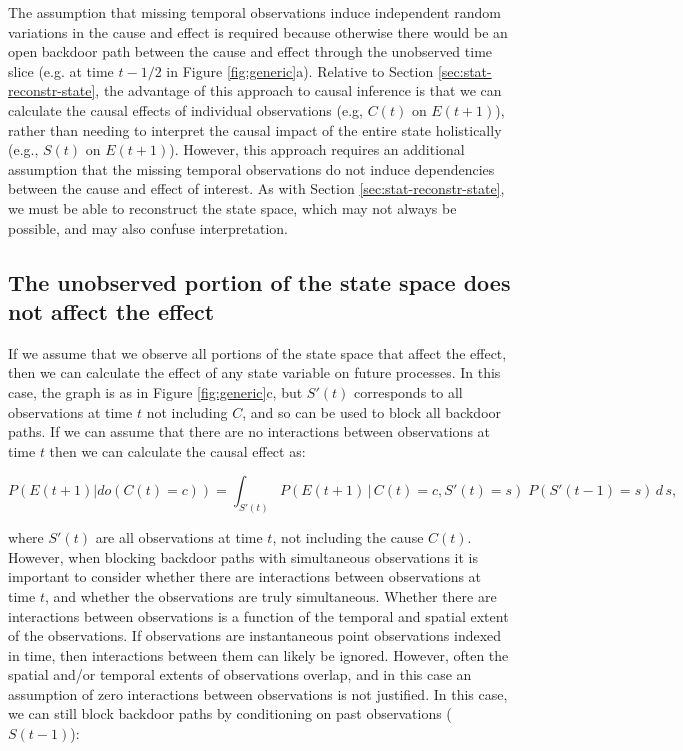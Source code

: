 \documentclass[12pt]{article}
\begin{document}
The assumption that missing temporal observations induce independent
random variations in the cause and effect is required because
otherwise there would be an open backdoor path between the cause and
effect through the unobserved time slice (e.g. at time $t-1/2$ in
Figure \ref{fig:generic}a). Relative to Section
\ref{sec:stat-reconstr-state}, the advantage of this approach to
causal inference is that we can calculate the causal effects of
individual observations (e.g, $C(t)$ on $E(t+1)$), rather than needing
to interpret the causal impact of the entire state holistically (e.g.,
$S(t)$ on $E(t+1)$). However, this approach requires an additional
assumption that the missing temporal observations do not induce
dependencies between the cause and effect of interest. As with Section
\ref{sec:stat-reconstr-state}, we must be able to reconstruct the
state space, which may not always be possible, and may also confuse
interpretation.


\subsection{The unobserved portion of the state space does not affect
  the effect}
\label{sec:observ-port-state}

If we assume that we observe all portions of the state space that
affect the effect, then we can calculate the effect of any state
variable on future processes. In this case, the graph is as in Figure
\ref{fig:generic}c, but $S'(t)$ corresponds to all observations at
time $t$ not including $C$, and so can be used to block all backdoor
paths. If we can assume that there are no interactions between
observations at time $t$ then we can calculate the causal effect as:

\begin{equation}
  P(E(t+1)| do(C(t)=c)) = \int_{S'(t)} P(E(t+1) \, | \, C(t)=c,
  S'(t) = s
  )\; P(S'(t-1)=s) \, d \, s,
\end{equation}

where $S'(t)$ are all observations at time $t$, not including the
cause $C(t)$. However, when blocking backdoor paths with simultaneous
observations it is important to consider whether there are
interactions between observations at time $t$, and whether the
observations are truly simultaneous. Whether there are interactions
between observations is a function of the temporal and spatial extent
of the observations. If observations are instantaneous point
observations indexed in time, then interactions between them can
likely be ignored. However, often the spatial and/or temporal extents
of observations overlap, and in this case an assumption of zero
interactions between observations is not justified. In this case, we
can still block backdoor paths by conditioning on past observations
($S(t-1)$):
\end{document}

